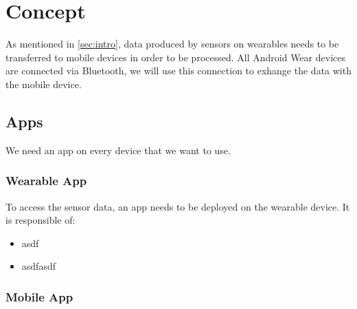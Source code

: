 \section{Concept}
\label{sec:concept}

As mentioned in \ref{sec:intro}, data produced by sensors on wearables needs to be transferred to mobile devices in order to be processed.
All Android Wear devices are connected via Bluetooth, we will use this connection to exhange the data with the mobile device.

\subsection{Apps}
We need an app on every device that we want to use.

\subsubsection{Wearable App}
To access the sensor data, an app needs to be deployed on the wearable device. It is responsible of:
\begin{itemize}[noitemsep]
	\item asdf
	\item asdfasdf
\end{itemize}

\subsubsection{Mobile App}


\clearpage